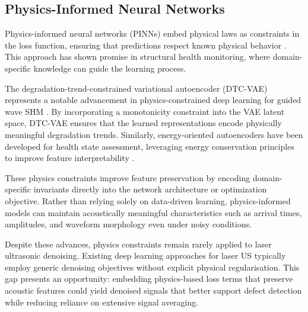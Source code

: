 \subsection{Physics-Informed Neural Networks}
\label{sec:physics-informed}

Physics-informed neural networks (PINNs) embed physical laws as constraints in the loss function, ensuring that predictions respect known physical behavior \cite{}. This approach has shown promise in structural health monitoring, where domain-specific knowledge can guide the learning process.

The degradation-trend-constrained variational autoencoder (DTC-VAE) represents a notable advancement in physics-constrained deep learning for guided wave SHM \cite{dtcvae2026}. By incorporating a monotonicity constraint into the VAE latent space, DTC-VAE ensures that the learned representations encode physically meaningful degradation trends. Similarly, energy-oriented autoencoders have been developed for health state assessment, leveraging energy conservation principles to improve feature interpretability \cite{perry2026health}.

These physics constraints improve feature preservation by encoding domain-specific invariants directly into the network architecture or optimization objective. Rather than relying solely on data-driven learning, physics-informed models can maintain acoustically meaningful characteristics such as arrival times, amplitudes, and waveform morphology even under noisy conditions.

Despite these advances, physics constraints remain rarely applied to laser ultrasonic denoising. Existing deep learning approaches for laser US typically employ generic denoising objectives without explicit physical regularisation. This gap presents an opportunity: embedding physics-based loss terms that preserve acoustic features could yield denoised signals that better support defect detection while reducing reliance on extensive signal averaging.

